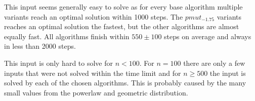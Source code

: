 This input seems generally easy to solve as for every base algorithm multiple variants reach an optimal solution within 1000 steps.
The $pmut_{-1.75}$ variants reaches an optimal solution the fastest, but the other algorithms are almost equally fast.
All algorithms finish within $550 \pm 100$ steps on average and always in less than 2000 steps.



This input is only hard to solve for $n<100$.
For $n = 100$ there are only a few inputs that were not solved within the time limit and for $n\ge500$ the input is solved by each of the chosen algorithms.
This is probably caused by the many small values from the powerlaw and geometric distribution.


% 

